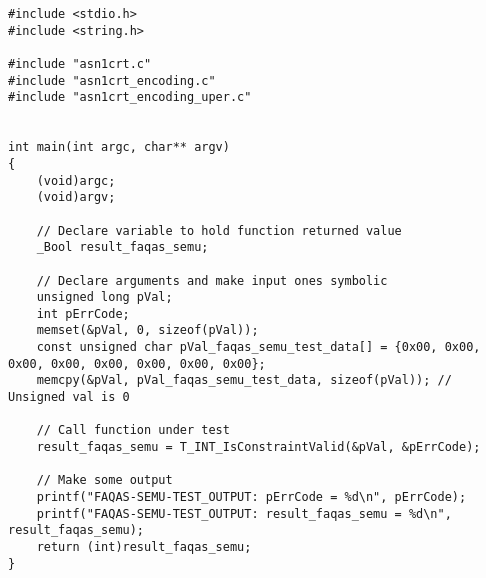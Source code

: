 
\begin{lstlisting}[float=t, style=CStyle,  caption=Generated test case, label=gen_test_case]
#include <stdio.h>
#include <string.h>

#include "asn1crt.c"
#include "asn1crt_encoding.c"
#include "asn1crt_encoding_uper.c"


int main(int argc, char** argv)
{
    (void)argc;
    (void)argv;

    // Declare variable to hold function returned value
    _Bool result_faqas_semu;

    // Declare arguments and make input ones symbolic
    unsigned long pVal;
    int pErrCode;
    memset(&pVal, 0, sizeof(pVal));
    const unsigned char pVal_faqas_semu_test_data[] = {0x00, 0x00, 0x00, 0x00, 0x00, 0x00, 0x00, 0x00};
    memcpy(&pVal, pVal_faqas_semu_test_data, sizeof(pVal)); // Unsigned val is 0

    // Call function under test
    result_faqas_semu = T_INT_IsConstraintValid(&pVal, &pErrCode);

    // Make some output
    printf("FAQAS-SEMU-TEST_OUTPUT: pErrCode = %d\n", pErrCode);
    printf("FAQAS-SEMU-TEST_OUTPUT: result_faqas_semu = %d\n", result_faqas_semu);
    return (int)result_faqas_semu;
}
\end{lstlisting}